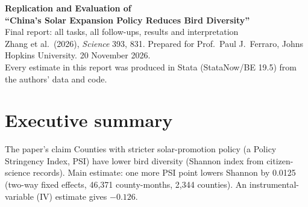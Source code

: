 \documentclass[11pt]{article}
\begin{document}
\begin{center}
{\LARGE\bfseries Replication and Evaluation of}\\[3pt]
{\LARGE\bfseries ``China's Solar Expansion Policy Reduces Bird Diversity''}\\[6pt]
{\large Final report: all tasks, all follow-ups, results and interpretation}\\[6pt]
{\small Zhang et al.\ (2026), \textit{Science} 393, 831. Prepared for Prof.\ Paul J.\ Ferraro, Johns Hopkins University. 20 November 2026.\\
Every estimate in this report was produced in Stata (StataNow/BE 19.5) from the authors' data and code.}
\end{center}

\tableofcontents
\newpage

\section{Executive summary}
\begin{keybox}{The paper's claim}
Counties with stricter solar-promotion policy (a Policy Stringency Index, PSI) have lower bird diversity (Shannon index from citizen-science records). Main estimate: one more PSI point lowers Shannon by 0.0125 (two-way fixed effects, 46,371 county-months, 2,344 counties). An instrumental-variable (IV) estimate gives $-0.126$.
\end{keybox}
\end{document}
